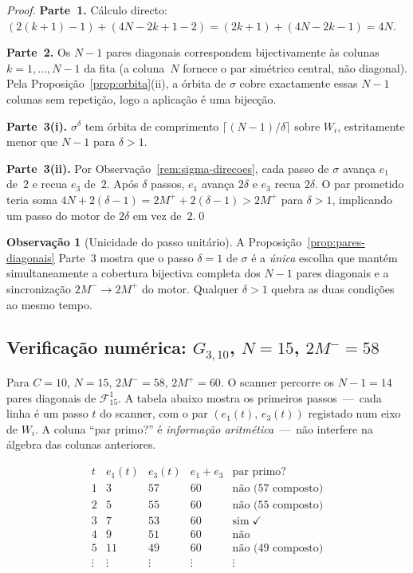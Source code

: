 \documentclass[12pt, a4paper]{article}
\theoremstyle{plain}
\theoremstyle{definition}
\newtheorem{remark}[theorem]{Observação}
\theoremstyle{remark}
\begin{document}
	\begin{proof}
		\textbf{Parte~1.}  Cálculo directo:
		$(2(k+1)-1)+(4N-2k+1-2)=(2k+1)+(4N-2k-1)=4N$.\checkmark
		
		\textbf{Parte~2.}  Os $N-1$ pares diagonais correspondem
		bijectivamente às colunas $k=1,\ldots,N-1$ da fita (a
		coluna~$N$ fornece o par simétrico central, não diagonal).  Pela
		Proposição~\ref{prop:orbita}(ii), a órbita de $\sigma$ cobre
		exactamente essas $N-1$ colunas sem repetição, logo a aplicação
		é uma bijecção.\checkmark
		
		\textbf{Parte~3(i).}  $\sigma^\delta$ tem órbita de comprimento
		$\lceil(N-1)/\delta\rceil$ sobre $W_i$, estritamente menor
		que $N-1$ para $\delta>1$.
		
		\textbf{Parte~3(ii).}  Por
		Observação~\ref{rem:sigma-direcoes}, cada passo de $\sigma$
		avança $e_1$ de~$2$ e recua $e_3$ de~$2$.  Após $\delta$ passos,
		$e_1$ avança $2\delta$ e $e_3$ recua $2\delta$.  O par prometido
		teria soma $4N+2(\delta-1)=2M^++2(\delta-1)>2M^+$ para $\delta>1$,
		implicando um passo do motor de $2\delta$ em vez de~$2$.\qed
	\end{proof}
	
	\begin{remark}[Unicidade do passo unitário]
		\label{rem:canonico}
		A Proposição~\ref{prop:pares-diagonais} Parte~3 mostra que
		o passo $\delta=1$ de $\sigma$ é a \emph{única} escolha que
		mantém simultaneamente a cobertura bijectiva completa dos $N-1$
		pares diagonais e a sincronização $2M^-\to2M^+$ do motor.
		Qualquer $\delta>1$ quebra as duas condições ao mesmo tempo.
	\end{remark}
	
	\subsection{Verificação numérica: $G_{3,10}$, $N=15$, $2M^-=58$}
	\label{subsec:verif-sigma}
	
	Para $C=10$, $N=15$, $2M^-=58$, $2M^+=60$.
	O scanner percorre os $N-1=14$ pares diagonais de $\mathcal{F}_{15}^1$.
	A tabela abaixo mostra os primeiros passos~---~cada linha é um passo
	$t$ do scanner, com o par $(e_1(t),\,e_3(t))$ registado num eixo de
	$W_i$.  A coluna ``par primo?'' é \emph{informação aritmética}~---~não
	interfere na álgebra das colunas anteriores.
	
	\[
	\begin{array}{c|cc|c|c}
		t & e_1(t) & e_3(t) & e_1+e_3 & \text{par primo?}\\
		\hline
		1 & 3  & 57 & 60 & \text{não (57 composto)}\\
		2 & 5  & 55 & 60 & \text{não (55 composto)}\\
		3 & 7  & 53 & 60 & \text{sim}\;\checkmark\\
		4 & 9  & 51 & 60 & \text{não}\\
		5 & 11 & 49 & 60 & \text{não (49 composto)}\\
		\vdots & \vdots & \vdots & \vdots & \vdots
	\end{array}
	\]
	
\end{document}

